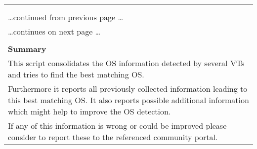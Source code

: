 \documentclass{article}
\begin{document}
\begin{longtable}{|p{}|}
\hline
\rowcolor{gvm_log}{\color{white}{Log (CVSS: 0.0) }}\\
\rowcolor{gvm_log}{\color{white}{NVT: OS Detection Consolidation and Reporting}}\\
\hline
\endfirsthead
\hfill\ldots continued from previous page \ldots \\
\hline
\endhead
\hline
\ldots continues on next page \ldots \\
\endfoot
\hline
\endlastfoot
\\
\textbf{Summary}\\
This script consolidates the OS information detected by several
  VTs and tries to find the best matching OS.\\
  Furthermore it reports all previously collected information leading to this best matching OS. It
  also reports possible additional information which might help to improve the OS detection.\\
  If any of this information is wrong or could be improved please consider to report these to the
  referenced community portal.\\


\end{longtable}
\end{document}

